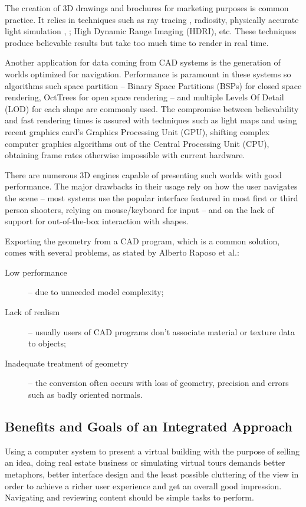 The creation of 3D drawings and brochures for marketing purposes is common practice.
It relies in techniques such as
ray tracing \cite{SITE-POVRAY},
radiosity,
physically accurate light simulation \cite{SITE-MAXWELL}, \cite{SITE-INDIGO}; 
High Dynamic Range Imaging (HDRI), etc.
These techniques produce believable results but take too much time to render in real time.

Another application for data coming from CAD systems is the generation of worlds optimized for navigation.
Performance is paramount in these systems so algorithms such space partition --
Binary Space Partitions (BSPs) for closed space rendering,
OctTrees for open space rendering --
and multiple Levels Of Detail (LOD) for each shape are commonly used.
The compromise between believability and fast rendering times is assured with techniques such as
light maps and using recent graphics card's Graphics Processing Unit (GPU),
shifting complex computer graphics algorithms out of the Central Processing Unit (CPU),
obtaining frame rates otherwise impossible with current hardware.

There are numerous 3D engines capable of presenting such worlds with good performance.
The major drawbacks in their usage rely on how the user navigates the scene --
most systems use the popular interface featured in most first or third person shooters,
relying on mouse/keyboard for input --
and on the lack of support for out-of-the-box interaction with shapes.

\newpage
Exporting the geometry from a CAD program, which is a common solution, comes with several problems,
as stated by Alberto Raposo et al.\cite{CADVR06}:
\begin{description}
	\item[Low performance] -- due to unneeded model complexity;
	\item[Lack of realism] -- usually users of CAD programs don't associate material
	or texture data to objects;
	\item[Inadequate treatment of geometry] -- the conversion often occurs with loss of
	geometry, precision and errors such as badly oriented normals.
\end{description}

\subsection{Benefits and Goals of an Integrated Approach}
Using a computer system to present a virtual building with the purpose of selling an idea,
doing real estate business or simulating virtual tours demands better metaphors,
better interface design and the least possible cluttering of the view in order
to achieve a richer user experience and get an overall good impression.
Navigating and reviewing content should be simple tasks to perform.

